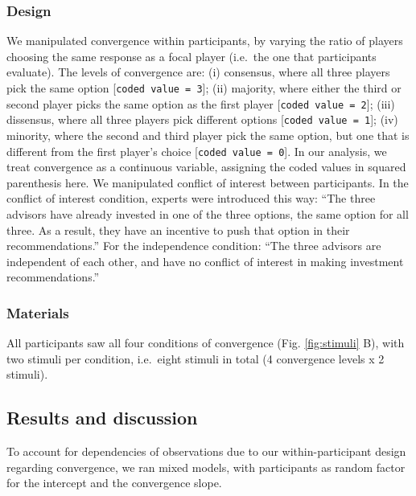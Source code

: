 \documentclass[
  doc,floatsintext]{apa6}
\begin{document}
\hypertarget{design-1}{%
\subsubsection{Design}\label{design-1}}

We manipulated convergence within participants, by varying the ratio of players choosing the same response as a focal player (i.e.~the one that participants evaluate). The levels of convergence are: (i) consensus, where all three players pick the same option {[}\texttt{coded\ value\ =\ 3}{]}; (ii) majority, where either the third or second player picks the same option as the first player {[}\texttt{coded\ value\ =\ 2}{]}; (iii) dissensus, where all three players pick different options {[}\texttt{coded\ value\ =\ 1}{]}; (iv) minority, where the second and third player pick the same option, but one that is different from the first player's choice {[}\texttt{coded\ value\ =\ 0}{]}. In our analysis, we treat convergence as a continuous variable, assigning the coded values in squared parenthesis here. We manipulated conflict of interest between participants. In the conflict of interest condition, experts were introduced this way: ``The three advisors have already invested in one of the three options, the same option for all three. As a result, they have an incentive to push that option in their recommendations.'' For the independence condition: ``The three advisors are independent of each other, and have no conflict of interest in making investment recommendations.''

\hypertarget{materials-1}{%
\subsubsection{Materials}\label{materials-1}}

All participants saw all four conditions of convergence (Fig. \ref{fig:stimuli} B), with two stimuli per condition, i.e.~eight stimuli in total (4 convergence levels x 2 stimuli).

\hypertarget{results-and-discussion-1}{%
\subsection{Results and discussion}\label{results-and-discussion-1}}

To account for dependencies of observations due to our within-participant design regarding convergence, we ran mixed models, with participants as random factor for the intercept and the convergence slope.
\end{document}
